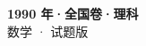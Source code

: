\documentclass[zihao=-4, a4paper]{ctexart}
\begin{document}
\begin{center}
  {\Large\bfseries 1990 年·全国卷·理科}\\[4pt]
  {\large 数学 · 试题版}
\end{center}
\medskip
{}

\end{document}
